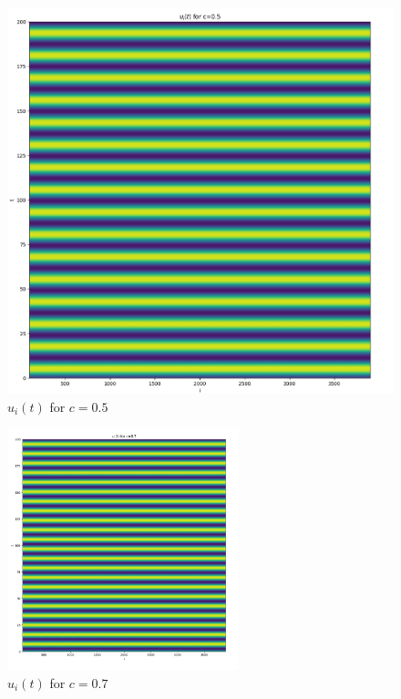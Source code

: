 \documentclass[a4paper, oneside]{book}
\begin{document}
\begin{figure}[htpb]
    \centering
    \includegraphics[width=1.0\textwidth]{./images/Pasted image 20231207115743.png}
    \caption{$u_i(t)$ for $c=0.5$}
\end{figure}

\begin{figure}[htpb]
    \centering
    \includegraphics[width=0.6\textwidth]{./images/Pasted image 20231207115816.png}
    \caption{$u_i(t)$ for $c=0.7$}
\end{figure}
\end{document}
